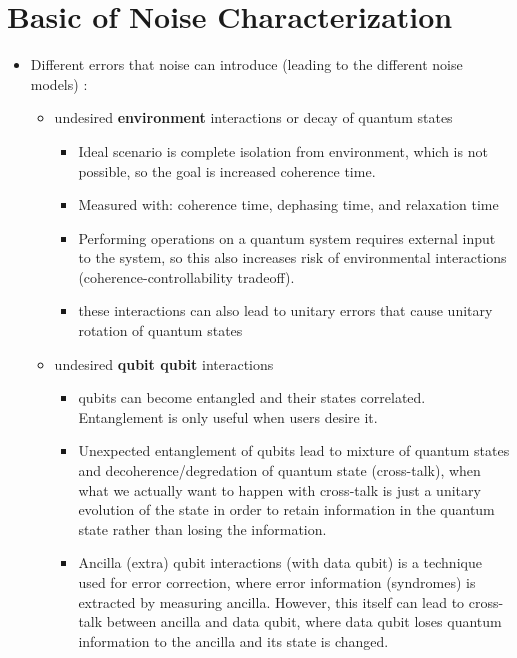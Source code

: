 \documentclass [12pt]{article}
\begin{document}

    \section{Basic of Noise Characterization}
        \begin{itemize}
            \item Different errors that noise can introduce (leading to the different noise models) \cite{resch21}:
                \begin{itemize}

                    \item undesired \textbf{environment} interactions or decay of quantum states
                        \begin{itemize}
                            \item Ideal scenario is complete isolation from environment, which is not possible, so the goal is increased coherence time. 
                            \item Measured with: coherence time, dephasing time, and relaxation time
                            \item Performing operations on a quantum system requires external input to the system, so this also increases risk of environmental interactions (coherence-controllability tradeoff). 
                            \item these interactions can also lead to unitary errors that cause unitary rotation of quantum states
                        \end{itemize}

                    \item undesired \textbf{qubit qubit} interactions
                        \begin{itemize}
                            \item qubits can become entangled and their states correlated. Entanglement is only useful when users desire it. 
                            \item Unexpected entanglement of qubits lead to mixture of quantum states and decoherence/degredation of quantum state (cross-talk), when what we actually want to happen with cross-talk is just a unitary evolution of the state in order to retain information in the quantum state rather than losing the information. 
                            \item Ancilla (extra) qubit interactions (with data qubit) is a technique used for error correction, where error information (syndromes) is extracted by measuring ancilla. However, this itself can lead to cross-talk between ancilla and data qubit, where data qubit loses quantum information to the ancilla and its state is changed.
                        \end{itemize}
                    

\end{itemize}
\end{itemize}
\end{document}
